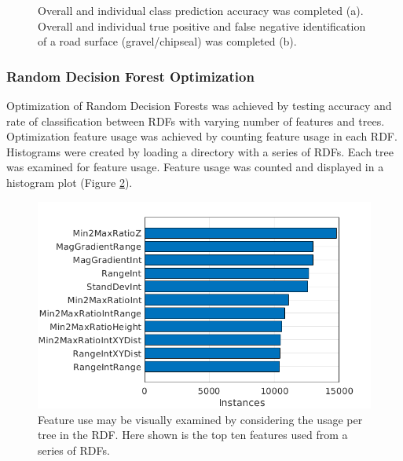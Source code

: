 \documentclass[numbered,pdftex]{ohio-etd}
\begin{document}
{{{{\begin{figure}[H]
					
					\caption[Validation Error Example Plots]{Overall and individual class prediction accuracy was completed (a). Overall and individual true positive and false negative identification of a road surface (gravel/chipseal) was completed (b).}
					
					\label{fig:Example_Err_Plts}
					
				\end{figure}
	
			} %
						
							
			\subsubsection{Random Decision Forest Optimization}\label{sec:random-decision-forest-optimization}{
				
				{Optimization of Random Decision Forests was achieved by testing accuracy and rate of classification between RDFs with varying number of features and trees. Optimization feature usage was achieved by counting feature usage in each RDF. Histograms were created by loading a directory with a series of RDFs. Each tree was examined for feature usage. Feature usage was counted and displayed in a histogram plot (Figure \ref{fig:feat_use_top_ten_example}). }		

				\begin{figure}[H]
					\centering
					\includegraphics[width=0.7\linewidth]{Defense_Images/feat_use_top_ten_example}
					\caption[Example Feature Use Histogram]{Feature use may be visually examined by considering the usage per tree in the RDF. Here shown is the top ten features used from a series of RDFs. }
					\label{fig:feat_use_top_ten_example}
				\end{figure}
			
}}}}
\end{document}
